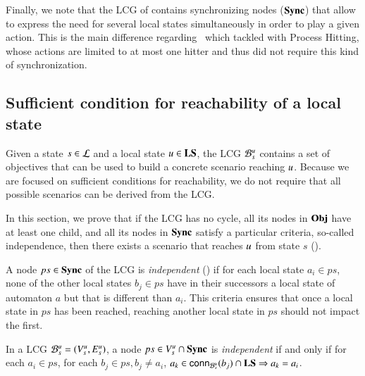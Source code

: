 Finally, we note that
the LCG of  contains synchronizing nodes ($\mathbf{Sync}$)
that allow to express the need for several local states simultaneously
in order to play a given action.
This is the main difference regarding~\cite{PMR12-MSCS,FPMR13-CS2Bio}
which tackled with Process Hitting, whose actions are limited to at most one hitter
and thus did not require this kind of synchronization.


\subsection{Sufficient condition for reachability of a local state}
\label{ssec:ua}

Given a state $s \in \mathcal{L}$ and a local state $u\in\mathbf{LS}$, the LCG ${\mathcal{B}_{s}^{u}}$ contains a set of objectives
that can be used to build a concrete scenario reaching $u$.
Because we are focused on sufficient conditions for reachability, we do not require that all
possible scenarios can be derived from the LCG.

In this section, we prove that if the LCG has no cycle, all its nodes in $\mathbf{Obj}$ have at least one
child, and all its nodes in $\mathbf{Sync}$ satisfy a
particular criteria, so-called independence,
then there exists a scenario that reaches $u$ from state $s$ ().

A node $ps \in \mathbf{Sync}$ of the LCG is \emph{independent} () if for each local state
$a_i\in ps$, none of the other local states $b_j\in ps$ have in their successors
a local state of automaton $a$ but that is different than $a_i$.
This criteria ensures that once a local state in $ps$ has been reached, reaching another local state
in $ps$ should not impact the first.

\begin{definition}
\label{def:coherent}
  In a LCG ${\mathcal{B}_{s}^{u}} = ({V_s^u}, {E_s^u})$,
  a node $ps \in {V_s^u}\cap\mathbf{Sync}$ is \emph{independent} if and only if
  for each $a_i\in ps$,
  for each $b_j\in ps, b_j\neq a_i$,
  $a_k \in\mathsf{conn}_{{\mathcal{B}_{s}^{u}}}(b_j) \cap \mathbf{LS} \Rightarrow a_k = a_i$.
\end{definition}

